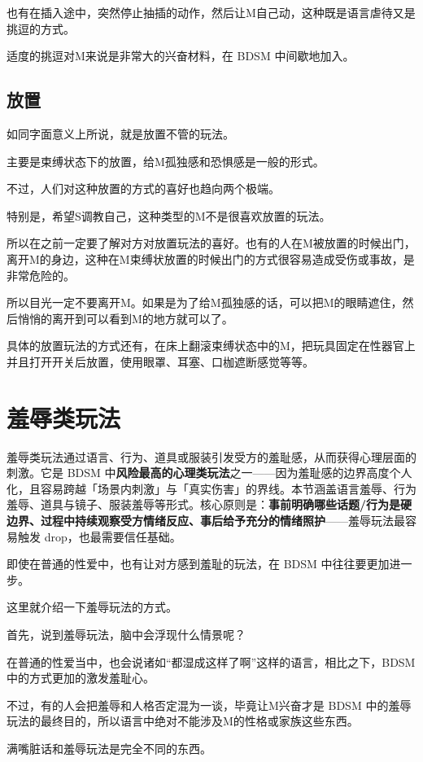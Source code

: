 \documentclass[12pt,UTF8]{ctexbook}
\begin{document}
也有在插入途中，突然停止抽插的动作，然后让M自己动，这种既是语言虐待又是挑逗的方式。

适度的挑逗对M来说是非常大的兴奋材料，在 BDSM 中间歇地加入。

\subsection{放置}

如同字面意义上所说，就是放置不管的玩法。

主要是束缚状态下的放置，给M孤独感和恐惧感是一般的形式。

不过，人们对这种放置的方式的喜好也趋向两个极端。

特别是，希望S调教自己，这种类型的M不是很喜欢放置的玩法。

所以在之前一定要了解对方对放置玩法的喜好。也有的人在M被放置的时候出门，离开M的身边，这种在M束缚状放置的时候出门的方式很容易造成受伤或事故，是非常危险的。

所以目光一定不要离开M。如果是为了给M孤独感的话，可以把M的眼睛遮住，然后悄悄的离开到可以看到M的地方就可以了。

具体的放置玩法的方式还有，在床上翻滚束缚状态中的M，把玩具固定在性器官上并且打开开关后放置，使用眼罩、耳塞、口枷遮断感觉等等。 

\section{羞辱类玩法}

羞辱类玩法通过语言、行为、道具或服装引发受方的羞耻感，从而获得心理层面的刺激。它是 BDSM 中\textbf{风险最高的心理类玩法}之一——因为羞耻感的边界高度个人化，且容易跨越「场景内刺激」与「真实伤害」的界线。本节涵盖语言羞辱、行为羞辱、道具与镜子、服装羞辱等形式。核心原则是：\textbf{事前明确哪些话题/行为是硬边界、过程中持续观察受方情绪反应、事后给予充分的情绪照护}——羞辱玩法最容易触发 drop，也最需要信任基础。

即使在普通的性爱中，也有让对方感到羞耻的玩法，在 BDSM 中往往要更加进一步。

这里就介绍一下羞辱玩法的方式。

首先，说到羞辱玩法，脑中会浮现什么情景呢？

在普通的性爱当中，也会说诸如“都湿成这样了啊”这样的语言，相比之下，BDSM 中的方式更加的激发羞耻心。

不过，有的人会把羞辱和人格否定混为一谈，毕竟让M兴奋才是 BDSM 中的羞辱玩法的最终目的，所以语言中绝对不能涉及M的性格或家族这些东西。

满嘴脏话和羞辱玩法是完全不同的东西。
\end{document}
